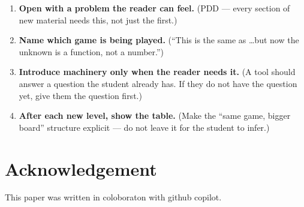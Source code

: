 \documentclass[11pt]{article}
\begin{document}
\begin{enumerate}
  \item \textbf{Open with a problem the reader can feel.} (PDD --- every section of new material needs this, not just the first.)
  \item \textbf{Name which game is being played.} (``This is the same as \ldots but now the unknown is a function, not a number.'')
  \item \textbf{Introduce machinery only when the reader needs it.} (A tool should answer a question the student already has. If they do not have the question yet, give them the question first.)
  \item \textbf{After each new level, show the table.} (Make the ``same game, bigger board'' structure explicit --- do not leave it for the student to infer.)
\end{enumerate}

\section{Acknowledgement}
This paper was written in coloboraton with github copilot.
\end{document}
